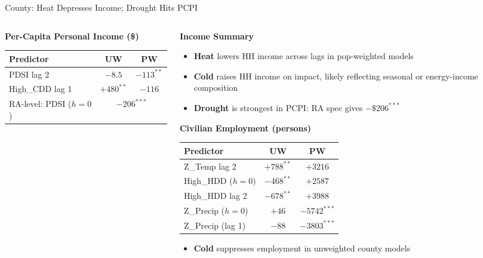 \documentclass[aspectratio=169,11pt]{beamer}
\newcommand{\emphcolor}[1]{{\color{WarmOrange}\textbf{#1}}}
\newcommand{\tealtext}[1]{{\color{Teal}#1}}
\begin{document}
\begin{frame}[shrink=12]{County: Heat Depresses Income; Drought Hits PCPI}
\begin{columns}[T]
\begin{column}{0.48\textwidth}
      \tealtext{\textbf{Per-Capita Personal Income (\$)}}\\[0.25em]
      \begin{tabular}{lcc}
        \toprule
        Predictor & UW & PW \\
        \midrule
        PDSI lag 2             & $-8.5$  & \emphcolor{$-113^{**}$} \\
        High\_CDD lag 1        & \emphcolor{$+480^{**}$} & $-116$ \\
        RA-level: PDSI ($h{=}0$) & \multicolumn{2}{c}{\emphcolor{$-206^{***}$}} \\
        \bottomrule
      \end{tabular}
    \end{column}
    \begin{column}{0.46\textwidth}
      \tealtext{\textbf{Income Summary}}\\[0.25em]
      \begin{itemize}\itemsep0.16em
        \item \emphcolor{Heat} lowers HH income across lags in pop-weighted models
        \item \emphcolor{Cold} raises HH income on impact, likely reflecting seasonal or energy-income composition
        \item \emphcolor{Drought} is strongest in PCPI: RA spec gives $-\$206^{***}$
      \end{itemize}
      \vspace{0.25em}
      \tealtext{\textbf{Civilian Employment (persons)}}\\[0.25em]
      \begin{tabular}{lcc}
        \toprule
        Predictor & UW & PW \\
        \midrule
        Z\_Temp lag 2       & \emphcolor{$+788^{**}$} & $+3216$ \\
        High\_HDD ($h{=}0$) & \emphcolor{$-468^{**}$} & $+2587$ \\
        High\_HDD lag 2     & \emphcolor{$-678^{**}$} & $+3988$ \\
        Z\_Precip ($h{=}0$) & $+46$   & \emphcolor{$-5742^{***}$} \\
        Z\_Precip (lag 1)   & $-88$   & \emphcolor{$-3803^{***}$} \\
        \bottomrule
      \end{tabular}
      \vspace{0.25em}
      \begin{itemize}\itemsep0.16em
        \item \emphcolor{Cold} suppresses employment in unweighted county models

\end{itemize}
\end{column}
\end{columns}
\end{frame}
\end{document}
